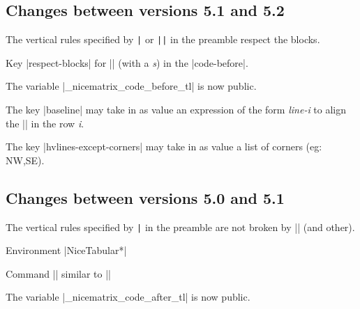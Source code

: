 \documentclass[dvipsnames]{article}%
\begin{document}
\subsection*{Changes between versions 5.1 and 5.2}

The vertical rules specified by \verb+|+ or \verb+||+ in the preamble respect
the blocks.

Key |respect-blocks| for |\rowcolors| (with a \emph{s}) in the |code-before|.

The variable |\g_nicematrix_code_before_tl| is now public.

The key |baseline| may take in as value an expression of the form
\textsl{line-i} to align the |\hline| in the row \textsl{i}.

The key |hvlines-except-corners| may take in as value a list of corners (eg: NW,SE).

\subsection*{Changes between versions 5.0 and 5.1}

The vertical rules specified by \verb+|+ in the preamble are not broken by
|\hline\hline| (and other).

Environment |{NiceTabular*}|

Command |\Vdotsfor| similar to |\Hdotsfor|

The variable |\g_nicematrix_code_after_tl| is now public.


\cleardoublepage

{}

\printindex


\newpage
\tableofcontents
\end{document}
